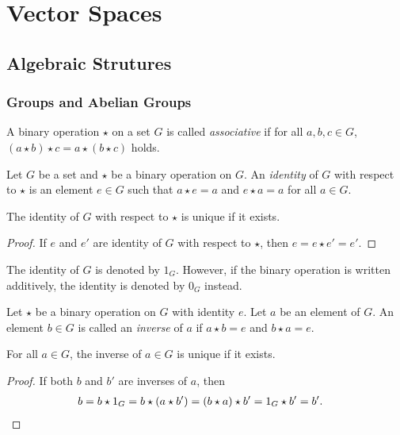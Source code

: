 \chapter{Vector Spaces}
\section{Algebraic Strutures}
\subsection{Groups and Abelian Groups}
\begin{definition}
  A binary operation $\star$ on a set $G$ is called \emph{associative} if
  for all $a, b, c \in G$, $(a \star b) \star c = a \star (b \star c)$ holds.
\end{definition}

\begin{definition}
  Let $G$ be a set and $\star$ be a binary operation on $G$. An
  \emph{identity} of $G$ with respect to $\star$ is an element $e \in G$ such
  that $a \star e = a$ and $e \star a = a$ for all $a \in G$.
\end{definition}

\begin{theorem}
  The identity of $G$ with respect to $\star$ is unique if it exists.
\end{theorem}
\begin{proof}
  If $e$ and $e'$ are identity of $G$ with respect to $\star$, then
  $e = e \star e' = e'$.
\end{proof}

\begin{notation}
  The identity of $G$ is denoted by $1_G$.
  However, if the binary operation is written additively, the identity is
  denoted by $0_G$ instead.
\end{notation}

\begin{definition}
  Let $\star$ be a binary operation on $G$ with identity $e$. Let $a$ be an
  element of $G$. An element $b \in G$ is called an \emph{inverse} of $a$ if
  $a \star b = e$ and $b \star a = e$.
\end{definition}

\begin{theorem}
  For all $a \in G$, the inverse of $a \in G$ is unique if it exists.
\end{theorem}
\begin{proof}
  If both $b$ and $b'$ are inverses of $a$, then
  \begin{align*}
  b
  = b \star 1_G
  = b \star (a \star b')
  = (b \star a) \star b'
  = 1_G \star b'
  = b'. &\qedhere
  \end{align*}
\end{proof}

